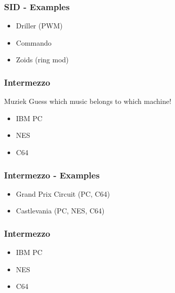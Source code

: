 \documentclass[aspectratio=43]{uva-inf-presentation}
\begin{document}

\begin{frame}
\frametitle{SID - Examples}

\begin{itemize}
\item Driller (PWM)
\item Commando
\item Zoids (ring mod)
\end{itemize}

\end{frame}


\begin{frame}
\frametitle{Intermezzo}

\begin{block}{Muziek}
Guess which music belongs to which machine!
\end{block}

\begin{itemize}
\item IBM PC
\item NES
\item C64
\end{itemize}

\end{frame}


\begin{frame}
\frametitle{Intermezzo - Examples}

\begin{itemize}
\item Grand Prix Circuit (PC, C64)
\item Castlevania (PC, NES, C64)
\end{itemize}

\end{frame}


\begin{frame}
\frametitle{Intermezzo}

\begin{itemize}
\item IBM PC
\item NES
\item C64
\end{itemize}

\end{frame}
\end{document}
